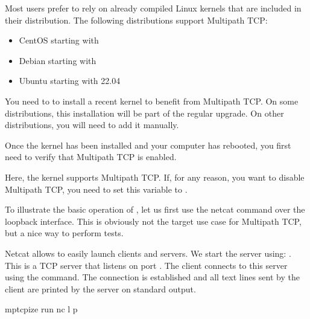 \documentclass[letterpaper,10pt,english]{sphinxmanual}
\begin{document}
\sphinxAtStartPar
Most users prefer to rely on already compiled Linux kernels that are included in their distribution. The following distributions support Multipath TCP:
\begin{itemize}
\item {} 
\sphinxAtStartPar
CentOS starting with

\item {} 
\sphinxAtStartPar
Debian starting with

\item {} 
\sphinxAtStartPar
Ubuntu starting with 22.04

\end{itemize}

\sphinxAtStartPar
You need to to install a recent kernel to benefit from Multipath TCP. On some distributions, this installation will be part of the regular upgrade. On other distributions, you will need to add it manually.

\sphinxAtStartPar
Once the kernel has been installed and your computer has rebooted, you first need to verify that Multipath TCP is enabled.

\begin{sphinxVerbatim}[commandchars=\\\{\}]
\end{sphinxVerbatim}

\sphinxAtStartPar
Here, the kernel supports Multipath TCP. If, for any reason, you want to disable Multipath TCP, you need to set this  variable to .

\sphinxAtStartPar
To illustrate the basic operation of , let us first use the netcat command over the loopback interface. This is obviously not the target use case for Multipath TCP, but a nice way to perform tests.

\sphinxAtStartPar
Netcat allows to easily launch clients and servers. We start the server using: . This is a TCP server that listens on port . The client connects to this server using the  command. The connection is established and all text lines sent by the client are printed by the server on standard output.

\begin{sphinxVerbatim}[commandchars=\\\{\}]
mptcpize run nc \PYGZhy{}l \PYGZhy{}p 
\end{sphinxVerbatim}
\end{document}
